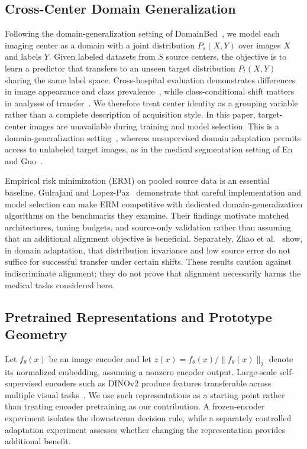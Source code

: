 \subsection{Cross-Center Domain Generalization}
Following the domain-generalization setting of DomainBed~\cite{gulrajani2021domainbed}, we model each imaging center as a domain with a joint distribution $P_s(X,Y)$ over images $X$ and labels $Y$. Given labeled datasets from $S$ source centers, the objective is to learn a predictor that transfers to an unseen target distribution $P_t(X,Y)$ sharing the same label space. Cross-hospital evaluation demonstrates differences in image appearance and class prevalence~\cite{zech2018generalization}, while class-conditional shift matters in analyses of transfer~\cite{zhao2019invariant}. We therefore treat center identity as a grouping variable rather than a complete description of acquisition style. In this paper, target-center images are unavailable during training and model selection. This is a domain-generalization setting~\cite{gulrajani2021domainbed}, whereas unsupervised domain adaptation permits access to unlabeled target images, as in the medical segmentation setting of En and Guo~\cite{en2024dpcl}.

Empirical risk minimization (ERM) on pooled source data is an essential baseline. Gulrajani and Lopez-Paz~\cite{gulrajani2021domainbed} demonstrate that careful implementation and model selection can make ERM competitive with dedicated domain-generalization algorithms on the benchmarks they examine. Their findings motivate matched architectures, tuning budgets, and source-only validation rather than assuming that an additional alignment objective is beneficial. Separately, Zhao et al.~\cite{zhao2019invariant} show, in domain adaptation, that distribution invariance and low source error do not suffice for successful transfer under certain shifts. These results caution against indiscriminate alignment; they do not prove that alignment necessarily harms the medical tasks considered here.

\subsection{Pretrained Representations and Prototype Geometry}
Let $f_\theta(x)$ be an image encoder and let $z(x)=f_\theta(x)/\|f_\theta(x)\|_2$ denote its normalized embedding, assuming a nonzero encoder output. Large-scale self-supervised encoders such as DINOv2 produce features transferable across multiple visual tasks~\cite{oquab2024dinov2}. We use such representations as a starting point rather than treating encoder pretraining as our contribution. A frozen-encoder experiment isolates the downstream decision rule, while a separately controlled adaptation experiment assesses whether changing the representation provides additional benefit.

